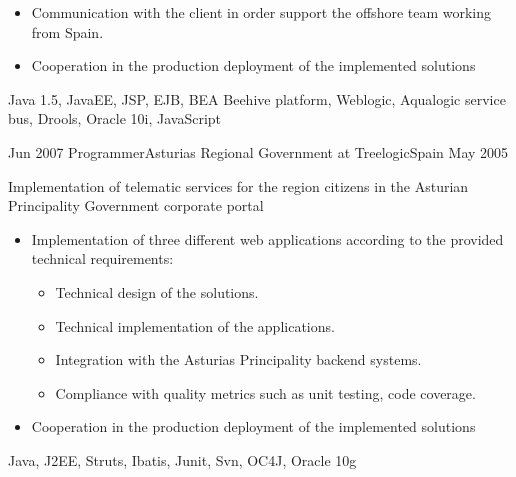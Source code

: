\begin{experiences}
{\begin{itemize}
                        \item Communication with the client in order support the offshore team working from Spain.

                        \item Cooperation in the production deployment of the implemented solutions
                        
                        
                      \end{itemize}
                    }                    
                    {Java 1.5, JavaEE, JSP, EJB, BEA Beehive platform, Weblogic, Aqualogic service bus, Drools, Oracle 10i, JavaScript}
                    
                    
                    
  \emptySeparator 
  
  
          
  \experience
  {Jun 2007}  {Programmer}{Asturias Regional Government at Treelogic}{Spain}
  {May 2005}   {
                      Implementation of  telematic services for the region citizens in the Asturian Principality Government corporate portal 
                      
                      \begin{itemize}

                        \item Implementation of three different web applications according to the provided technical requirements:
                         \begin{itemize}
                         	\item Technical design of the solutions.
                         	\item Technical implementation of the applications.
                        	\item Integration with the Asturias Principality backend systems.
                        	\item Compliance with quality metrics such as unit testing, code coverage.
                        \end{itemize}
                        
                        \item Cooperation in the production deployment of the implemented solutions

                      \end{itemize}
                  }
                  {Java, J2EE, Struts, Ibatis, Junit, Svn, OC4J, Oracle 10g} 
                   
\end{experiences}
